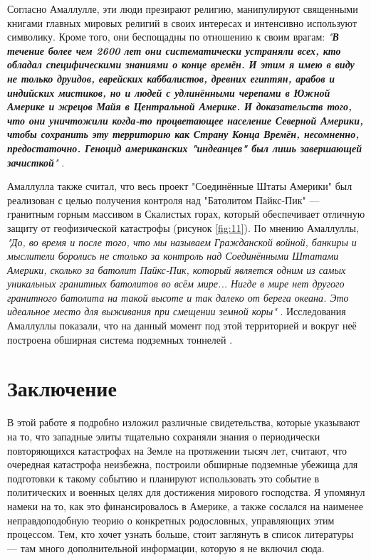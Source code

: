 \documentclass[10pt,twocolumn,letterpaper]{article}
\begin{document}
Согласно Амаллулле, эти люди презирают религию, манипулируют священными книгами главных мировых религий в своих интересах и интенсивно используют символику. Кроме того, они беспощадны по отношению к своим врагам: \textit{"\textbf{В течение более чем 2600 лет они систематически устраняли всех, кто обладал специфическими знаниями о конце времён. И этим я имею в виду не только друидов, еврейских каббалистов, древних египтян, арабов и индийских мистиков, но и людей с удлинёнными черепами в Южной Америке и жрецов Майя в Центральной Америке. И доказательств того, что они уничтожили когда-то процветающее население Северной Америки, чтобы сохранить эту территорию как Страну Конца Времён, несомненно, предостаточно. Геноцид американских "индеанцев" был лишь завершающей зачисткой}"} \cite{33,34}.

Амаллулла также считал, что весь проект "Соединённые Штаты Америки" был реализован с целью получения контроля над "Батолитом Пайкс-Пик" — гранитным горным массивом в Скалистых горах, который обеспечивает отличную защиту от геофизической катастрофы (рисунок \ref{fig:11}). По мнению Амаллуллы, \textit{"До, во время и после того, что мы называем Гражданской войной, банкиры и мыслители боролись не столько за контроль над Соединёнными Штатами Америки, сколько за батолит Пайкс-Пик, который является одним из самых уникальных гранитных батолитов во всём мире... Нигде в мире нет другого гранитного батолита на такой высоте и так далеко от берега океана. Это идеальное место для выживания при смещении земной коры"} \cite{33,34}. Исследования Амаллуллы показали, что на данный момент под этой территорией и вокруг неё построена обширная система подземных тоннелей \cite{36}.
\section{Заключение}

В этой работе я подробно изложил различные свидетельства, которые указывают на то, что западные элиты тщательно сохраняли знания о периодически повторяющихся катастрофах на Земле на протяжении тысяч лет, считают, что очередная катастрофа неизбежна, построили обширные подземные убежища для подготовки к такому событию и планируют использовать это событие в политических и военных целях для достижения мирового господства. Я упомянул намеки на то, как это финансировалось в Америке, а также сослался на наименее неправдоподобную теорию о конкретных родословных, управляющих этим процессом. Тем, кто хочет узнать больше, стоит заглянуть в список литературы — там много дополнительной информации, которую я не включил сюда.
\end{document}
